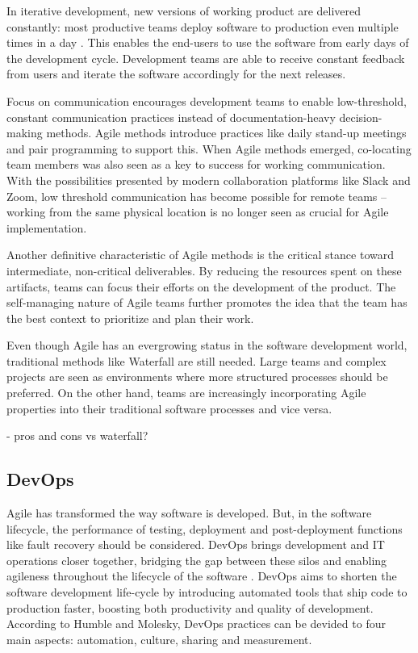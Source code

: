 In iterative development, new versions of working product are delivered constantly: most productive teams deploy software to production even multiple times in a day \cite{forsgren_accelerate_2018}. This enables the end-users to use the software from early days of the development cycle. Development teams are able to receive constant feedback from users and iterate the software accordingly for the next releases. \cite{balaji_waterfall_2012}

Focus on communication encourages development teams to enable low-threshold, constant communication practices instead of documentation-heavy decision-making methods. Agile methods introduce practices like daily stand-up meetings and pair programming to support this. When Agile methods emerged, co-locating team members was also seen as a key to success for working communication. With the possibilities presented by modern collaboration platforms like Slack and Zoom, low threshold communication has become possible for remote teams – working from the same physical location is no longer seen as crucial for Agile implementation.

Another definitive characteristic of Agile methods is the critical stance toward intermediate, non-critical deliverables. By reducing the resources spent on these artifacts, teams can focus their efforts on the development of the product. \cite{cohen_introduction_2004} The self-managing nature of Agile teams further promotes the idea that the team has the best context to prioritize and plan their work. \cite{alshamrani_comparison_2015} 

Even though Agile has an evergrowing status in the software development world, traditional methods like Waterfall are still needed. Large teams and complex projects are seen as environments where more structured processes should be preferred. On the other hand, teams are increasingly incorporating Agile properties into their traditional software processes and vice versa. \cite{cohen_introduction_2004} 

- pros and cons vs waterfall?

\subsection{DevOps}

Agile has transformed the way software is developed. But, in the software lifecycle, the performance of testing, deployment and post-deployment functions like fault recovery should be considered. DevOps brings development and IT operations closer together, bridging the gap between these silos and enabling agileness throughout the lifecycle of the software \cite{hemon-hildgen_agile_2020}. DevOps aims to shorten the software development life-cycle by introducing automated tools that ship code to production faster, boosting both productivity and quality of development\cite{cois_modern_2014}. According to Humble and Molesky, DevOps practices can be devided to four main aspects: automation, culture, sharing and measurement\cite{humble_why_2011}. 

